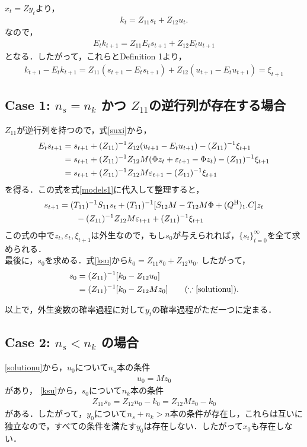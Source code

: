 \documentclass[a4j, dvipdfmx]{jarticle}
\begin{document}
$x_t = Zy_t$より，
\begin{align}
k_t = Z_{11} s_t  + Z_{12} u_t.\label{ksu}
\end{align}
なので，
\begin{align*}
E_t k_{t+1} = Z_{11} E_ts_{t+1} + Z_{12} E_tu_{t+1}
\end{align*}
となる．したがって，これらとDefinition 1より，
\begin{align}
k_{t+1} - E_t k_{t+1} = Z_{11} (s_{t+1} - E_ts_{t+1}) + Z_{12} (u_{t+1} - E_tu_{t+1}) = \xi_{t+1} \label{suxi}
\end{align}

\subsection{Case 1: $n_s = n_k$ かつ $Z_{11}$の逆行列が存在する場合}
$Z_{11}$が逆行列を持つので，式\eqref{suxi}から，
\begin{align}
E_ts_{t+1} &= s_{t+1} + (Z_{11})^{-1}Z_{12}(u_{t+1} - E_tu_{t+1}) - (Z_{11})^{-1}\xi_{t+1}\notag\\
&= s_{t+1} + (Z_{11})^{-1}Z_{12}M(\Phi z_t + \varepsilon_{t+1} - \Phi z_t) - (Z_{11})^{-1}\xi_{t+1} \notag\\
&= s_{t+1} + (Z_{11})^{-1}Z_{12}M \varepsilon_{t+1} - (Z_{11})^{-1}\xi_{t+1}\label{etst1}
\end{align}
を得る．この式を式\eqref{models1}に代入して整理すると，
\begin{align}
s_{t+1} &= (T_{11})^{-1}S_{11}s_t + (T_{11})^{-1}[S_{12}M - T_{12}M\Phi + (Q^{\rm{H}})_{1\cdot}C]z_t \notag\\
&\qquad -(Z_{11})^{-1}Z_{12}M \varepsilon_{t+1} + (Z_{11})^{-1}\xi_{t+1} \label{solutions}
\end{align}
この式の中で$z_t, \varepsilon_t, \xi_{t+1}$は外生なので，もし$s_0$が与えられれば，$\{s_t\}_{t=0}^\infty$を全て求められる．\\

最後に，$s_0$を求める．式\eqref{ksu}から$k_0 = Z_{11}s_0 + Z_{12} u_0$. したがって，
\begin{align}
s_0 &= (Z_{11})^{-1}[k_0 - Z_{12}u_0]\notag\\
&= (Z_{11})^{-1}[k_0 - Z_{12}Mz_0] \qquad (\because \eqref{solutionu}). \label{solutions0}
\end{align}

以上で，外生変数の確率過程に対して$y_t$の確率過程がただ一つに定まる．

\subsection{Case 2: $n_s < n_k$ の場合}
\eqref{solutionu}から，$u_0$について$n_u$本の条件
\begin{align}
u_0 = Mz_0
\end{align}
があり，
\eqref{ksu}から，$s_0$について$n_k$本の条件
\begin{align}
Z_{11}s_0 = Z_{12}u_0 - k_0 = Z_{12}M z_0 - k_0
\end{align}
がある．したがって，$y_0$について$n_s + n_k > n$本の条件が存在し，これらは互いに独立なので，すべての条件を満たす$y_0$は存在しない．したがって$x_0$も存在しない．
\end{document}
